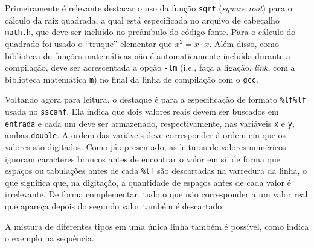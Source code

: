 \documentclass[
  11pt,
  a4paper,
]{scrbook}
\begin{document}
Primeiramente é relevante destacar o uso da função \texttt{sqrt}
(\emph{square root}) para o cálculo da raiz quadrada, a qual está
especificada no arquivo de cabeçalho \texttt{math.h}, que deve ser
incluído no preâmbulo do código fonte. Para o cálculo do quadrado foi
usado o ``truque'' elementar que \({x^2 = x\cdot x}\). Além disso, como
biblioteca de funções matemáticas não é automaticamente incluída durante
a compilação, deve ser acrescentada a opção \texttt{-lm} (i.e., faça a
ligação, \emph{link}, com a biblioteca matemática \texttt{m}) no final
da linha de compilação com o \texttt{gcc}.

Voltando agora para leitura, o destaque é para a especificação de
formato \texttt{\%lf\%lf} usada no \texttt{sscanf}. Ela indica que dois
valores reais devem ser buscados em \texttt{entrada} e cada um deve ser
armazenado, respectivamente, nas variáveis \texttt{x} e \texttt{y},
ambas \texttt{double}. A ordem das variáveis deve corresponder à ordem
em que os valores são digitados. Como já apresentado, as leituras de
valores numéricos ignoram caracteres brancos antes de encontrar o valor
em si, de forma que espaços ou tabulações antes de cada \texttt{\%lf}
são descartadas na varredura da linha, o que significa que, na
digitação, a quantidade de espaços antes de cada valor é irrelevante. De
forma complementar, tudo o que não corresponder a um valor real que
apareça depois do segundo valor também é descartado.

A mistura de diferentes tipos em uma única linha também é possível, como
indica o exemplo na sequência.
\end{document}
